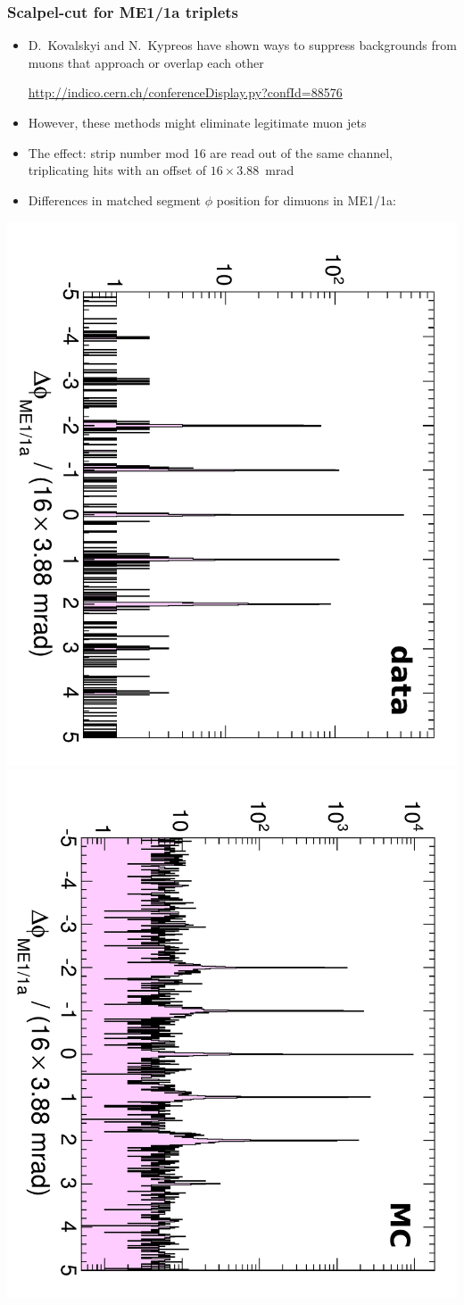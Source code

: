 \documentclass[compress]{beamer}
\begin{document}
\begin{frame}
\frametitle{Scalpel-cut for ME1/1a triplets}

\begin{itemize}
\item D.\ Kovalskyi and N.\ Kypreos have shown ways to suppress
  backgrounds from muons that approach or overlap each other

\href{http://indico.cern.ch/conferenceDisplay.py?confId=88576}{\scriptsize http://indico.cern.ch/conferenceDisplay.py?confId=88576}

\item However, these methods might eliminate legitimate muon jets

\item The effect: strip number mod 16 are read out of the same channel, triplicating hits with an offset of $16 \times 3.88$~mrad

\item Differences in matched segment $\phi$ position for dimuons in ME1/1a:
\end{itemize}

\includegraphics[height=0.5\linewidth, angle=90]{gangedstripcut.pdf} \includegraphics[height=0.5\linewidth, angle=90]{gangedstripcut_MC.pdf}
\end{frame}
\end{document}

